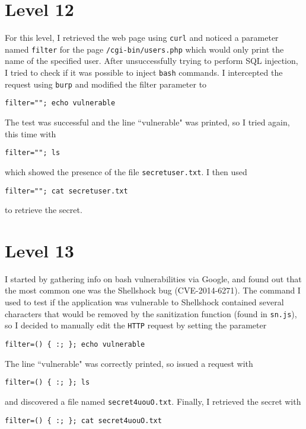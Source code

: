 \documentclass[12pt,a4paper]{article}
\begin{document}
	\section*{Level 12}
For this level, I retrieved the web page using \texttt{curl} and noticed a parameter named \texttt{filter} for the page \texttt{/cgi-bin/users.php} which would only print the name of the specified user. After unsuccessfully trying to perform SQL injection, I tried to check if it was possible to inject \texttt{bash} commands. I intercepted the request using \texttt{burp} and modified the filter parameter to \begin{center}\texttt{filter=""; echo vulnerable}\end{center}
The test was successful and the line ``vulnerable" was printed, so I tried again, this time with \begin{center}\texttt{filter=""; ls}\end{center} which showed the presence of the file \texttt{secretuser.txt}. I then used \begin{center}\texttt{filter=""; cat secretuser.txt}\end{center} to retrieve the secret.

	\section*{Level 13}
	I started by gathering info on bash vulnerabilities via Google, and found out that the most common one was the Shellshock bug (CVE-2014-6271).
	The command I used to test if the application was vulnerable to Shellshock contained several characters that would be removed by the sanitization function (found in \texttt{sn.js}), so I decided to manually edit the \texttt{HTTP} request by setting the parameter \begin{center}\texttt{filter=() \{ :; \}; echo vulnerable}\end{center}
	The line ``vulnerable" was correctly printed, so issued a request with \begin{center}\texttt{filter=() \{ :; \}; ls}\end{center} and discovered a file named \texttt{secret4uouO.txt}. Finally, I retrieved the secret with \begin{center}\texttt{filter=() \{ :; \}; cat secret4uouO.txt}\end{center}
	
\end{document}
